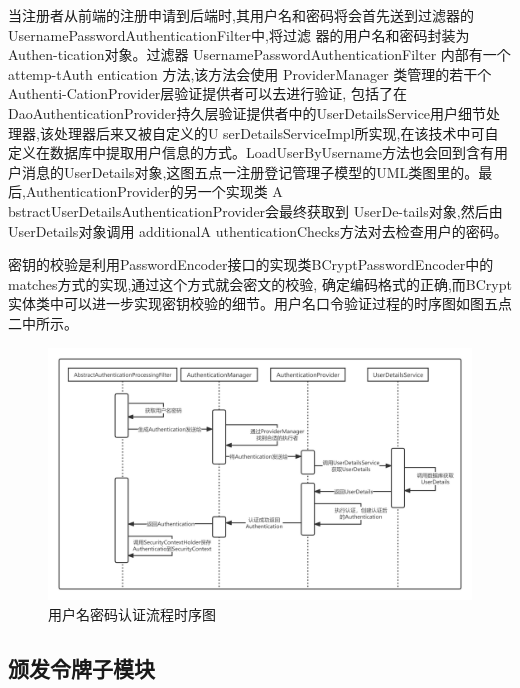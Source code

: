 当注册者从前端的注册申请到后端时,其用户名和密码将会首先送到过滤器的UsernamePasswordAuthenticationFilter中,将过滤
器的用户名和密码封装为Authen-tication对象。过滤器 UsernamePasswordAuthenticationFilter 内部有一个 attemp-tAuth
entication 方法,该方法会使用 ProviderManager 类管理的若干个 Authenti-CationProvider层验证提供者可以去进行验证,
包括了在DaoAuthenticationProvider持久层验证提供者中的UserDetailsService用户细节处理器,该处理器后来又被自定义的U
serDetailsServiceImpl所实现,在该技术中可自定义在数据库中提取用户信息的方式。LoadUserByUsername方法也会回到含有用
户消息的UserDetails对象,这图五点一注册登记管理子模型的UML类图里的。最后,AuthenticationProvider的另一个实现类 A
bstractUserDetailsAuthenticationProvider会最终获取到 UserDe-tails对象,然后由 UserDetails对象调用 additionalA
uthenticationChecks方法对去检查用户的密码。

密钥的校验是利用PasswordEncoder接口的实现类BCryptPasswordEncoder中的matches方式的实现,通过这个方式就会密文的校验,
确定编码格式的正确,而BCrypt实体类中可以进一步实现密钥校验的细节。用户名口令验证过程的时序图如图五点二中所示。

\begin{figure}[htb]
    \centering
    \includegraphics[width=1\textwidth]{my_figures/chapter5/用户名密码认证流程时序图.png}
    \caption{用户名密码认证流程时序图}
    \label{fig:用户名密码认证流程时序图}
\end{figure}


\subsection{颁发令牌子模块}


